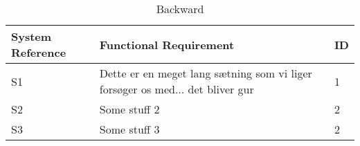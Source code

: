 \documentclass[Main]{subfiles}
\begin{document}
\begin{table}[htbp]
	\centering
	\begin{tabular}{p{3.5cm} p{10cm} l} \hline
	System Reference & Functional Requirement & ID\\\hline
	S1 & Dette er en meget lang sætning som vi liger forsøger os med... det bliver gur & 1 \\
	S2 & Some stuff 2 & 2 \\ 
	S3 & Some stuff 3 & 2\\\hline
	\end{tabular}

\caption{Backward}
\label{Tab:Backward}
\end{table}
\end{document}

